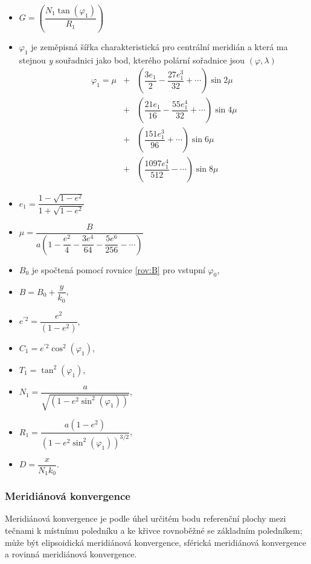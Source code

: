 \documentclass[11pt,a4paper]{article}
\begin{document}
\begin{itemize}
\item $G = \left(\dfrac{N_{1}\tan{\left(\varphi_{1}\right)}}{R_{1}}\right)$
\item $\varphi_{1}$ je zeměpisná šířka charakteristická pro centrální meridián a která ma stejnou \textit{y} souřadnici jako bod, kterého polární sořadnice jsou $\left(\varphi, \lambda\right)$ 
\begin{eqnarray} \nonumber
\varphi_{1} = \mu &+& \left( \dfrac{3e_{1}}{2} - \dfrac{27e_{1}^{3}}{32} + \cdots \right)\sin{2\mu} \\ \nonumber
                  &+& \left( \dfrac{21e_{1}}{16} - \dfrac{55e_{1}^{4}}{32} + \cdots \right)\sin{4\mu} \\ \nonumber
                  &+& \left( \dfrac{151e_{1}^{3}}{96} + \cdots \right)\sin{6\mu} \\ \nonumber
                  &+& \left( \dfrac{1097e_{1}^{4}}{512} - \cdots \right)\sin{8\mu} \nonumber
\end{eqnarray}
\item $
e_{1} = \dfrac{1 - \sqrt{1-e^{2}}}{1 + \sqrt{1-e^{2}}}
$
\item $\mu = \dfrac{B}{a\left(1-\dfrac{e^{2}}{4} - \dfrac{3e^{4}}{64} - \dfrac{5e^{6}}{256} - \cdots\right)} 
$
\item $B_{0}$ je spočtená pomocí rovnice \ref{rov:B} pro vstupní $\varphi_{0}$,
\item $B = B_{0} + \dfrac{y}{k_{0}}$,
\item $e^{'2} = \dfrac{e^{2}}{\left(1-e^{2}\right)}$,
\item $C_{1} = e^{'2}\cos^{2}{\left(\varphi_{1}\right)}$,
\item $T_{1} = \tan^{2}{\left(\varphi_{1}\right)}$,
\item $N_{1} = \dfrac{a}{\sqrt{\left(1-e^{2}\sin^{2}{\left(\varphi_{1}\right)}\right)}}$,
\item $R_{1} = \dfrac{a\left(1-e^{2}\right)}{\left(1-e^{2}\sin^{2}{\left(\varphi_{1}\right)}\right)^{3/2}}$,
\item $D = \dfrac{x}{N_{1}k_{0}}$.
\end{itemize}

\subsubsection*{Meridiánová konvergence}
Meridiánová konvergence je podle \cite{webVUGTK} úhel určitém bodu referenční plochy mezi tečnami k místnímu poledníku a ke křivce rovnoběžné se základním poledníkem; může být elipsoidická meridiánová konvergence, sférická meridiánová konvergence a rovinná meridiánová konvergence.
\end{document}

